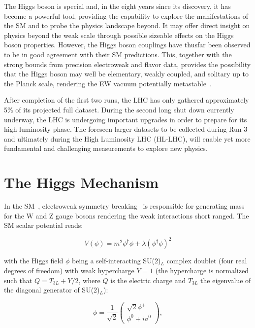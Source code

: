 The Higgs boson is special and, in the eight years since its discovery, it has become a powerful tool, providing the capability to explore the manifestations of the SM and to probe the physics landscape beyond. It may offer direct insight on physics beyond the weak scale through possible sizeable effects on the Higgs boson properties. However, the Higgs boson couplings have thusfar been observed to be in good agreement with their SM predictions. This, together with the strong bounds from precision electroweak and flavor data, provides the possibility that the Higgs boson may well be elementary, weakly coupled, and solitary up to the Planck scale, rendering the EW vacuum potentially metastable~\cite{Degrassi:2012ry,Alekhin:2012py,Buttazzo:2013uya}.

After completion of the first two runs, the LHC has only gathered approximately 5\% of its projected full dataset. During the second long shut down currently underway, the LHC is undergoing important upgrades in order to prepare for its high luminosity phase. The foreseen larger datasets to be collected during Run 3 and ultimately during the High Luminosity LHC (HL-LHC), will enable yet more fundamental and challenging measurements to explore new physics.

\section{The Higgs Mechanism}

In the SM~\cite{Glashow:1961tr,PhysRevLett.19.1264,PhysRevD.2.1285}, electroweak symmetry breaking~\cite{PhysRevLett.13.321,PhysRev.145.1156} is responsible for generating mass for the W and Z gauge bosons rendering the weak interactions short ranged. The SM scalar potential reads:

\begin{equation}
    V (\phi) = m^2\phi^\dagger\phi + \lambda(\phi^\dagger\phi)^2
\end{equation}

with the Higgs field $\phi$ being a self-interacting SU(2)$_L$ complex doublet (four real degrees of freedom) with weak hypercharge $Y = 1$ (the hypercharge is normalized such that $Q = T_{3L} + Y /2$, where $Q$ is the electric charge and $T_{3L}$ the eigenvalue of the diagonal generator of SU(2)$_L$):

\begin{equation}
    \phi = \frac{1}{\sqrt{2}}
    \begin{pmatrix}
        \sqrt{2}\phi^+ \\
        \phi^0 + ia^0
    \end{pmatrix},
\end{equation}

